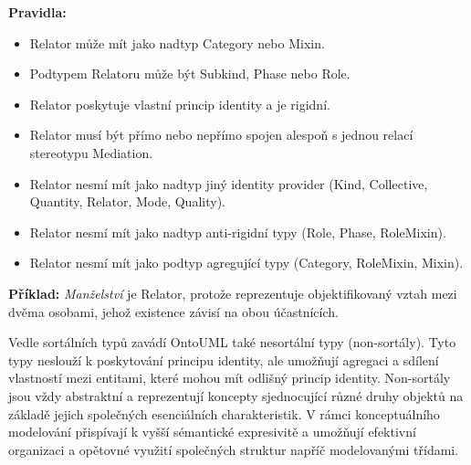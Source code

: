 \begin{itemize}
  \textbf{Pravidla:}
  \begin{itemize}
    \item Relator může mít jako nadtyp Category nebo Mixin.
    \item Podtypem Relatoru může být Subkind, Phase nebo Role.
    \item Relator poskytuje vlastní princip identity a je rigidní.
    \item Relator musí být přímo nebo nepřímo spojen alespoň s jednou relací stereotypu Mediation.
    \item Relator nesmí mít jako nadtyp jiný identity provider (Kind, Collective, Quantity, Relator, Mode, Quality).
    \item Relator nesmí mít jako nadtyp anti-rigidní typy (Role, Phase, RoleMixin).
    \item Relator nesmí mít jako podtyp agregující typy (Category, RoleMixin, Mixin). \cite{ontouml_class_stereotypes}
  \end{itemize}

  \textbf{Příklad:} \textit{Manželství} je Relator, protože reprezentuje objektifikovaný vztah mezi dvěma osobami, jehož existence závisí na obou účastnících.
\end{itemize}
\vspace{1em}

\noindent Vedle sortálních typů zavádí OntoUML také nesortální typy (non-sortály). Tyto typy neslouží k poskytování principu identity, ale umožňují agregaci a sdílení vlastností mezi entitami, které mohou mít odlišný princip identity. Non-sortály jsou vždy abstraktní a reprezentují koncepty sjednocující různé druhy objektů na základě jejich společných esenciálních charakteristik. V rámci konceptuálního modelování přispívají k vyšší sémantické expresivitě a umožňují efektivní organizaci a opětovné využití společných struktur napříč modelovanými třídami. \cite{Guizzardi2005, KOM_prezentace3}


